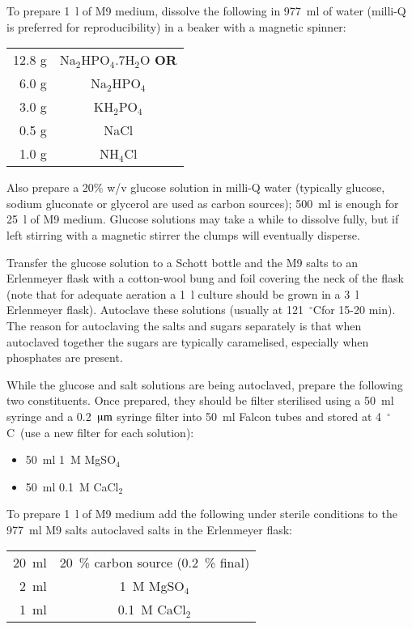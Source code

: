 \documentclass[a4paper]{article}
\newcommand{\dc}{~$^{\circ}$C}
\begin{document}
\begin{multicols}{2}
To prepare 1~l of M9 medium, dissolve the following in 977~ml of water (milli-Q is
preferred for reproducibility) in a beaker with a magnetic spinner:

\begin{center}
\begin{tabular}[h]{rc} \toprule
12.8 g  & Na$_2$HPO$_4$.7H$_2$O \textbf{OR}\\
6.0 g  & Na$_2$HPO$_4$\\\midrule
3.0 g  & KH$_2$PO$_4$\\
0.5 g   & NaCl\\
1.0 g   & NH$_4$Cl\\ \bottomrule
\end{tabular}
\end{center}

Also prepare a 20\% w/v glucose solution in milli-Q water (typically glucose,
sodium gluconate or glycerol are used as carbon sources); 500~ml is enough for
25~l of M9 medium.  Glucose solutions may take a while to dissolve fully, but
if left stirring with a magnetic stirrer the clumps will eventually disperse.

Transfer the glucose solution to a Schott bottle and the M9 salts to an
Erlenmeyer flask with a cotton-wool bung and foil covering the neck of the
flask (note that for adequate aeration a 1~l culture should be grown in a 3~l
Erlenmeyer flask). Autoclave these solutions (usually at 121\dc for 15-20 min).
The reason for autoclaving the salts and sugars separately is that when
autoclaved together the sugars are typically caramelised, especially when
phosphates are present.

While the glucose and salt solutions are being autoclaved, prepare the
following two constituents. Once prepared, they should be filter sterilised
using a 50~ml syringe and a 0.2~$\mathrm{\muup m}$ syringe filter into 50~ml
Falcon tubes and stored at 4\dc\ (use a new filter for each solution):

\begin{itemize}
\item 50~ml 1~M MgSO$_4$
\item 50~ml 0.1~M CaCl$_2$
\end{itemize}

To prepare 1~l of M9 medium add the following under sterile conditions to the
977~ml M9 salts autoclaved salts in the Erlenmeyer flask:

\begin{center}
\begin{tabular}[h]{rc} \toprule
20~ml   & 20~\% carbon source (0.2~\% final)\\
2~ml    & 1~M MgSO$_4$\\
1~ml    & 0.1~M CaCl$_2$\\ \bottomrule
\end{tabular}
\end{center}


\end{multicols}
\end{document}
